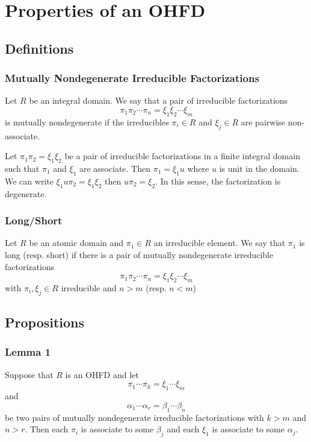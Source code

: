 \section{Properties of an OHFD}

\subsection{Definitions}

\begin{frame}
  \frametitle{Mutually Nondegenerate Irreducible Factorizations}
  \begin{definition}
    Let $R$ be an integral domain. We say that a pair of irreducible factorizations
      $$\pi_1\pi_2\cdots\pi_n = \xi_1\xi_2\cdots\xi_m$$
    is \alert{mutually nondegenerate} if the irreducibles $\pi_i \in R$ and $\xi_j \in R$ are pairwise non-associate.
  \end{definition}
  \begin{example}
    Let $\pi_1 \pi_2 = \xi_1 \xi_2$ be a pair of irreducible factorizations in a finite integral domain such that $\pi_1$ and $\xi_1$ are associate.
    Then $\pi_1 = \xi_1 u$ where $u$ is unit in the domain.
    We can write $\xi_1 u \pi_2 = \xi_1 \xi_2$ then $u \pi_2 = \xi_2$.
    In this sense, the factorization is degenerate.
  \end{example}
\end{frame}

\begin{frame}
  \frametitle{Long/Short}
  \begin{definition}
    Let $R$ be an atomic domain and $\pi_1 \in R$ an irreducible element.
    We say that $\pi_1$ is \alert{long} (resp. \alert{short}) if there is a pair of mutually nondegenerate irreducible factorizations
      $$\pi_1\pi_2\cdots\pi_n = \xi_1\xi_2\cdots \xi_m$$
    with $\pi_i, \xi_j \in R$ irreducible and $n > m$ (resp. $n<m$)
  \end{definition}
\end{frame}

\subsection{Propositions}

\begin{frame}
  \frametitle{Lemma 1}
  \begin{lemma}
    Suppose that $R$ is an OHFD and let
      $$\pi_1\cdots\pi_k=\xi_1\cdots\xi_m$$
      and
      $$\alpha_1\cdots\alpha_r=\beta_1\cdots\beta_n$$
    be two pairs of mutually nondegenerate irreducible factorizations with $k>m$ and $n>r$.
    Then each $\pi_i$ is associate to some $\beta_j$ and each $\xi_1$ is associate to some $\alpha_j$. 
  \end{lemma}
\end{frame}

